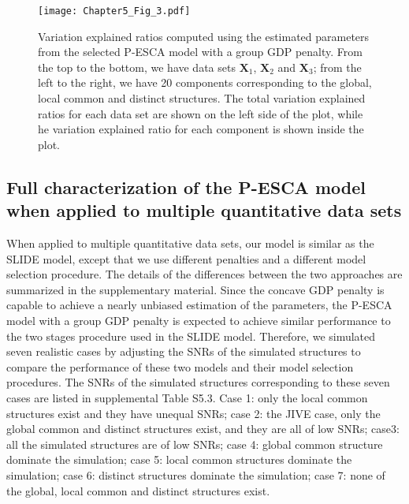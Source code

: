 \begin{figure}[h]
    \centering
    \texttt{[image: Chapter5\_Fig\_3.pdf]}
    \caption{Variation explained ratios computed using the estimated parameters from the selected P-ESCA model with a group GDP penalty. From the top to the bottom, we have data sets $\mathbf{X}_1$, $\mathbf{X}_2$ and $\mathbf{X}_3$; from the left to the right, we have 20 components corresponding to the global, local common and distinct structures. The total variation explained ratios for each data set are shown on the left side of the plot, while he variation explained ratio for each component is shown inside the plot.}
	\label{chapter5_fig:3}
\end{figure}

\subsection{Full characterization of the P-ESCA model when applied to multiple quantitative data sets}
When applied to multiple quantitative data sets, our model is similar as the SLIDE model, except that we use different penalties and a different model selection procedure. The details of the differences between the two approaches are summarized in the supplementary material. Since the concave GDP penalty is capable to achieve a nearly unbiased estimation of the parameters, the P-ESCA model with a group GDP penalty is expected to achieve similar performance to the two stages procedure used in the SLIDE model. Therefore, we simulated seven realistic cases by adjusting the SNRs of the simulated structures to compare the performance of these two models and their model selection procedures. The SNRs of the simulated structures corresponding to these seven cases are listed in supplemental Table S5.3. Case 1: only the local common structures exist and they have unequal SNRs; case 2: the JIVE case, only the global common and distinct structures exist, and they are all of low SNRs; case3: all the simulated structures are of low SNRs; case 4: global common structure dominate the simulation; case 5: local common structures dominate the simulation; case 6: distinct structures dominate the simulation; case 7: none of the global, local common and distinct structures exist.

